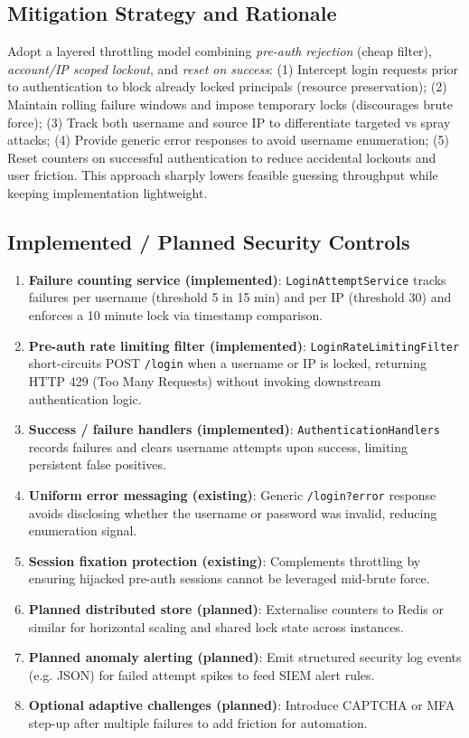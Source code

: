 \documentclass[]{UCD_CS_FYP_Report}
\begin{document}
\subsection*{Mitigation Strategy and Rationale}
Adopt a layered throttling model combining \textit{pre-auth rejection} (cheap filter), \textit{account/IP scoped lockout}, and \textit{reset on success}: (1) Intercept login requests prior to authentication to block already locked principals (resource preservation); (2) Maintain rolling failure windows and impose temporary locks (discourages brute force); (3) Track both username and source IP to differentiate targeted vs spray attacks; (4) Provide generic error responses to avoid username enumeration; (5) Reset counters on successful authentication to reduce accidental lockouts and user friction. This approach sharply lowers feasible guessing throughput while keeping implementation lightweight.

\subsection*{Implemented / Planned Security Controls}
\begin{enumerate}
	\item \textbf{Failure counting service (implemented)}: \texttt{LoginAttemptService} tracks failures per username (threshold 5 in 15 min) and per IP (threshold 30) and enforces a 10 minute lock via timestamp comparison.
	\item \textbf{Pre-auth rate limiting filter (implemented)}: \texttt{LoginRateLimitingFilter} short-circuits POST \texttt{/login} when a username or IP is locked, returning HTTP 429 (Too Many Requests) without invoking downstream authentication logic.
	\item \textbf{Success / failure handlers (implemented)}: \texttt{AuthenticationHandlers} records failures and clears username attempts upon success, limiting persistent false positives.
	\item \textbf{Uniform error messaging (existing)}: Generic \texttt{/login?error} response avoids disclosing whether the username or password was invalid, reducing enumeration signal.
	\item \textbf{Session fixation protection (existing)}: Complements throttling by ensuring hijacked pre-auth sessions cannot be leveraged mid-brute force.
	\item \textbf{Planned distributed store (planned)}: Externalise counters to Redis or similar for horizontal scaling and shared lock state across instances.
	\item \textbf{Planned anomaly alerting (planned)}: Emit structured security log events (e.g. JSON) for failed attempt spikes to feed SIEM alert rules.
	\item \textbf{Optional adaptive challenges (planned)}: Introduce CAPTCHA or MFA step-up after multiple failures to add friction for automation.
\end{enumerate}
\end{document}
